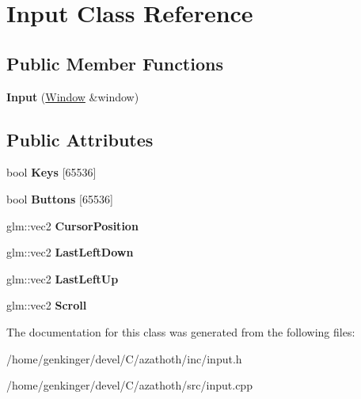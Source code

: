 \hypertarget{classInput}{}\section{Input Class Reference}
\label{classInput}
\subsection*{Public Member Functions}
\begin{DoxyCompactItemize}
\item 
\mbox{\label{classInput_a5fb0b1362c0a62db46e08bb87920f13c}} 
{\bfseries Input} (\mbox{\hyperlink{classWindow}{Window}} \&window)
\end{DoxyCompactItemize}
\subsection*{Public Attributes}
\begin{DoxyCompactItemize}
\item 
\mbox{\label{classInput_af13757a75f15ace39182bd5cd2802f97}} 
bool {\bfseries Keys} \mbox{[}65536\mbox{]}
\item 
\mbox{\label{classInput_a386f9a433b8eb373739271c61d52c86a}} 
bool {\bfseries Buttons} \mbox{[}65536\mbox{]}
\item 
\mbox{\label{classInput_adad1550f636d8bd641b27330c1c3c947}} 
glm\+::vec2 {\bfseries Cursor\+Position}
\item 
\mbox{\label{classInput_ac61867e705a197b5b13404dfbe76fd2a}} 
glm\+::vec2 {\bfseries Last\+Left\+Down}
\item 
\mbox{\label{classInput_a80d983f9bd53ef71f437cb754cd5e678}} 
glm\+::vec2 {\bfseries Last\+Left\+Up}
\item 
\mbox{\label{classInput_ab00ba298dba3e55a90ad1752b7451636}} 
glm\+::vec2 {\bfseries Scroll}
\end{DoxyCompactItemize}


The documentation for this class was generated from the following files\+:\begin{DoxyCompactItemize}
\item 
/home/genkinger/devel/\+C/azathoth/inc/input.\+h\item 
/home/genkinger/devel/\+C/azathoth/src/input.\+cpp\end{DoxyCompactItemize}
